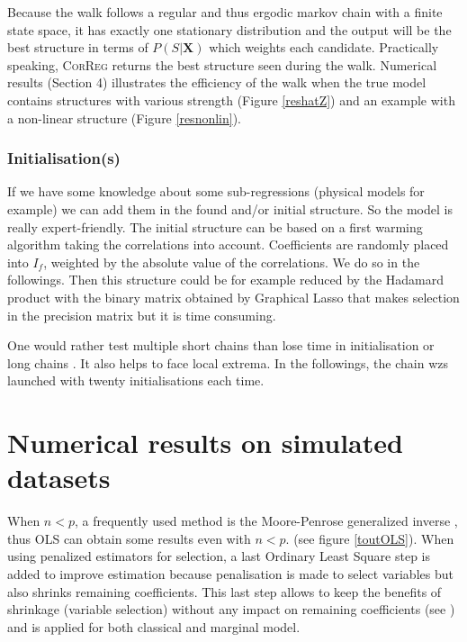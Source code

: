 \documentclass[11pt,a4paper]{article}
\begin{document}
Because the walk follows a regular and thus ergodic markov chain with a finite state space, it has exactly one stationary distribution \cite{grinstead1997introduction} %
%	
%	
%		
and the output will be the best structure in terms of $P(S|\boldsymbol{X})$ which weights each candidate. Practically speaking, \textsc{CorReg} returns the best structure seen during the walk.
Numerical results (Section 4) illustrates the efficiency of the walk when the true model contains structures with various strength (Figure \ref{reshatZ}) and an example with a non-linear structure (Figure \ref{resnonlin}).

 \subsubsection{Initialisation(s)}
 If we have some knowledge about some sub-regressions (physical models for example) we can add them in the found and/or initial structure. So the model is really expert-friendly.
The initial structure can be based on a first warming algorithm taking the correlations into account. Coefficients are randomly placed into $I_f$, weighted by the absolute value of the correlations. We do so in the followings. Then this structure could be for example reduced by the Hadamard product with the binary matrix obtained by Graphical Lasso\cite{friedman2008sparse} that makes selection in the precision matrix but it is time consuming.

	One would rather test multiple short chains than lose time in initialisation or long chains \cite{gilks1996markov}. It also helps to face local extrema. In the followings, the chain wzs launched with twenty initialisations each time.
	
\section{Numerical results on simulated datasets} \label{sectionsimul}
	When $n<p$, a frequently used method is the Moore-Penrose generalized inverse \cite{katsikis2008fast}, thus OLS can obtain some results even with $n<p$. (see figure \ref{toutOLS}).
	When using penalized estimators for selection, a last Ordinary Least Square step is added to improve estimation because penalisation is made to select variables but also shrinks remaining coefficients. This last step allows to keep the benefits of shrinkage (variable selection) without any impact on remaining coefficients (see \cite{SAM10088}) and is applied for both classical and marginal model.
\end{document}
